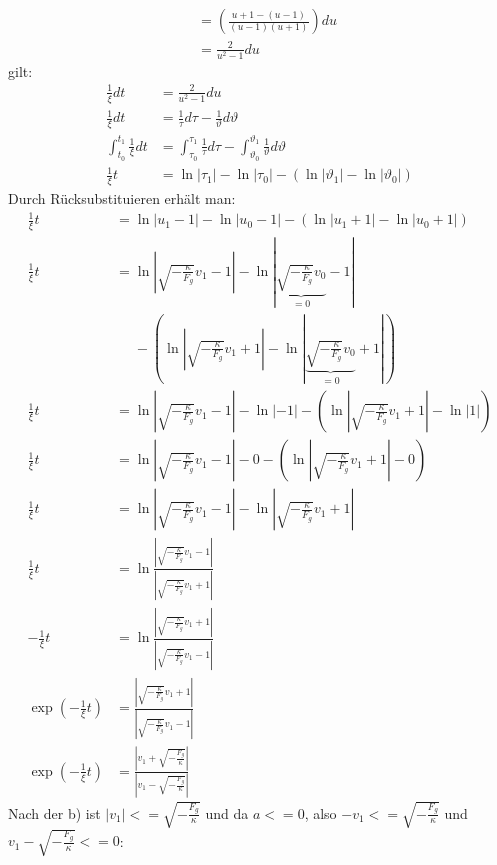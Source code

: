 \documentclass[sectionformat = aufgabe]{gadsescript}
\begin{document}
\begin{enumerate}[label=\alph*)]
\begin{align*}
			~&= \left(\frac{u + 1  - (u - 1)}{(u - 1) (u + 1)}\right)du\\
			~&= \frac{2}{u^2 - 1}du
		\end{align*}
		gilt:
		\begin{align*}
			\frac{1}{\xi}dt &= \frac{2}{u^2 - 1} du\\
			\frac{1}{\xi}dt &= \frac{1}{\tau} d\tau - \frac{1}{\vartheta}d\vartheta\\
			\int_{t_0}^{t_1} \frac{1}{\xi}dt &= \int_{\tau_0}^{\tau_1} \frac{1}{\tau} d\tau - \int_{\vartheta_0}^{\vartheta_1} \frac{1}{\vartheta}d\vartheta\\
			\frac{1}{\xi} t &= \ln |\tau_1| - \ln |\tau_0| - \left( \ln |\vartheta_1| - \ln |\vartheta_0| \right)
		\end{align*}
		Durch Rücksubstituieren erhält man:
		\begin{align*}
			\frac{1}{\xi} t &= \ln |u_1 - 1| - \ln |u_0 - 1| - \left( \ln |u_1 + 1| - \ln |u_0 + 1| \right)\\
			\frac{1}{\xi} t &= \ln |\sqrt{-\frac{\kappa}{F_g}} v_1 - 1| - \ln |\underbrace{\sqrt{-\frac{\kappa}{F_g}} v_0}_{=0} - 1|\\
			~&\phantom{=} - \left( \ln |\sqrt{-\frac{\kappa}{F_g}} v_1 + 1| - \ln |\underbrace{\sqrt{-\frac{\kappa}{F_g}} v_0}_{=0} + 1| \right)\\
			\frac{1}{\xi} t &= \ln |\sqrt{-\frac{\kappa}{F_g}} v_1 - 1| - \ln |-1| - \left( \ln |\sqrt{-\frac{\kappa}{F_g}} v_1 + 1| - \ln |1| \right)\\
			\frac{1}{\xi} t &= \ln |\sqrt{-\frac{\kappa}{F_g}} v_1 - 1| - 0 - \left( \ln |\sqrt{-\frac{\kappa}{F_g}} v_1 + 1| - 0 \right)\\
			\frac{1}{\xi} t &= \ln |\sqrt{-\frac{\kappa}{F_g}} v_1 - 1|  - \ln |\sqrt{-\frac{\kappa}{F_g}} v_1 + 1|\\
			\frac{1}{\xi} t &= \ln \frac{|\sqrt{-\frac{\kappa}{F_g}} v_1 - 1|}{|\sqrt{-\frac{\kappa}{F_g}} v_1 + 1|}\\
			- \frac{1}{\xi} t &= \ln \frac{|\sqrt{-\frac{\kappa}{F_g}} v_1 + 1|}{|\sqrt{-\frac{\kappa}{F_g}} v_1 - 1|}\\
			\exp(- \frac{1}{\xi} t) &= \frac{|\sqrt{-\frac{\kappa}{F_g}} v_1 + 1|}{|\sqrt{-\frac{\kappa}{F_g}} v_1 - 1|}\\
			\exp(- \frac{1}{\xi} t) &= \frac{| v_1 + \sqrt{-\frac{F_g}{\kappa}}|}{| v_1 - \sqrt{-\frac{F_g}{\kappa}}|}
		\end{align*}
		Nach der b) ist $ |v_1| <= \sqrt{-\frac{F_g}{\kappa}} $ und da $a <= 0 $, also $ -v_1 <= \sqrt{ - \frac{F_g}{\kappa}} $ und $ v_1 - \sqrt{ - \frac{F_g}{\kappa}} <= 0 $:

\end{enumerate}
\end{document}
